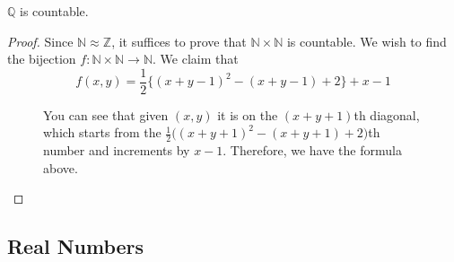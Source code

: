 \documentclass{article}
\begin{document}
    \begin{theorem}
      $\mathbb{Q}$ is countable. 
    \end{theorem}
    \begin{proof}
      Since $\mathbb{N} \approx \mathbb{Z}$, it suffices to prove that $\mathbb{N} \times \mathbb{N}$ is countable. We wish to find the bijection $f: \mathbb{N} \times \mathbb{N} \rightarrow \mathbb{N}$. We claim that 
      \begin{equation}
        f(x, y) = \frac{1}{2} \big\{ (x + y - 1)^2 - (x + y - 1) + 2 \big\} + x - 1
      \end{equation}
      \begin{figure}[H]
        \centering 
        \caption{You can see that given $(x, y)$ it is on the $(x+y+1)$th diagonal, which starts from the $\frac{1}{2} \big((x+y+1)^2 - (x+y+1) + 2)$th number and increments by $x-1$. Therefore, we have the formula above. } 
        \label{fig:rationals_countable}
      \end{figure}
    \end{proof}

  \subsection{Real Numbers} 
\end{document}
